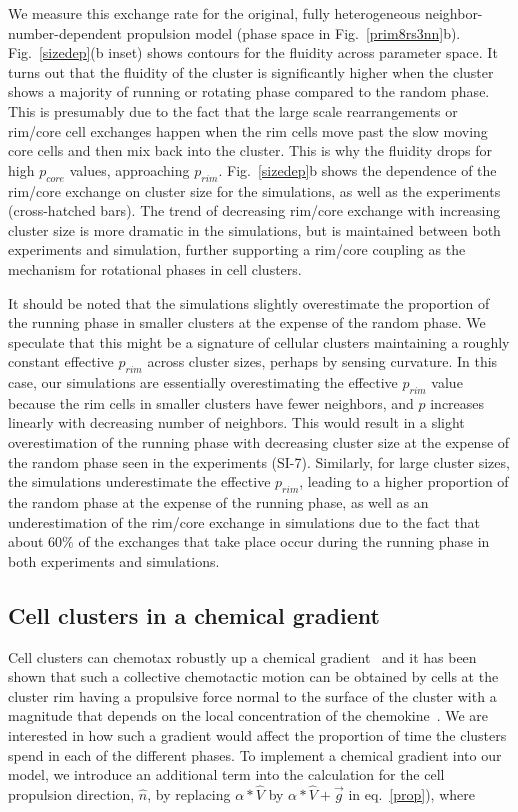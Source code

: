 \documentclass{article}
\begin{document}
We measure this exchange rate for the original, fully heterogeneous neighbor-number-dependent propulsion model (phase space in Fig.~\ref{prim8rs3nn}b). Fig.~\ref{sizedep}(b inset) shows contours for the fluidity across parameter space. It turns out that the fluidity of the cluster is significantly higher when the cluster shows a majority of running or rotating phase compared to the random phase. This is presumably due to the fact that the large scale rearrangements or rim/core cell exchanges happen when the rim cells move past the slow moving core cells and then mix back into the cluster. This is why the fluidity drops for high $p_{core}$ values, approaching $p_{rim}$.   Fig.~\ref{sizedep}b shows the dependence of the rim/core exchange on cluster size for the simulations, as well as the experiments (cross-hatched bars).  The trend of decreasing rim/core exchange with increasing cluster size is more dramatic in the simulations, but is maintained between both experiments and simulation, further supporting a rim/core coupling as the mechanism for rotational phases in cell clusters.

It should be noted that the simulations slightly overestimate the proportion of the running phase in smaller clusters at the expense of the random phase. We speculate that this might be a signature of cellular clusters maintaining a roughly constant effective $p_{rim}$ across cluster sizes, perhaps by sensing curvature. In this case, our simulations are essentially overestimating the effective $p_{rim}$ value because the rim cells in smaller clusters have fewer neighbors, and $p$ increases linearly with decreasing number of neighbors. This would result in a slight overestimation of the running phase with decreasing cluster size at the expense of the random phase seen in the experiments (SI-7). Similarly, for large cluster sizes, the simulations underestimate the effective $p_{rim}$, leading to a higher proportion of the random phase at the expense of the running phase, as well as an underestimation of the rim/core exchange in simulations due to the fact that about $60\%$ of the exchanges that take place occur during the running phase in both experiments and simulations.

\subsection*{Cell clusters in a chemical gradient}

Cell clusters can chemotax robustly up a chemical gradient~\cite{Malet-Engra2014} and it has been shown that such a collective chemotactic motion can be obtained by cells at the cluster rim having a propulsive force normal to the surface of the cluster with a magnitude that depends on the local concentration of the chemokine~\cite{Malet-Engra2014,Levchenko2002,Camley2015b}.  We are interested in how such a gradient would affect the proportion of time the clusters spend in each of the different phases. To implement a chemical gradient into our model, we introduce an additional term into the calculation for the cell propulsion direction, $\hat{n}$, by replacing $\alpha*\hat{V}$ by $\alpha*\hat{V}+ \vec{g}$  in eq.~\ref{prop}), where
\end{document}

